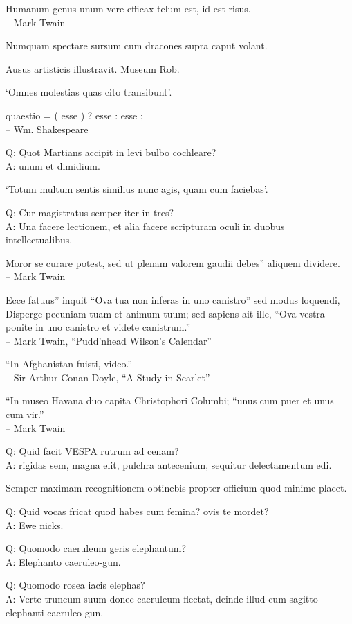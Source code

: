 \documentclass[titlepage,12pt]{memoir}
\begin{document}
Humanum genus unum vere efficax telum est, id est risus.
\\-- Mark Twain

Numquam spectare sursum cum dracones supra caput volant.

Ausus artisticis illustravit. Museum Rob.

‘Omnes molestias quas cito transibunt’.

 quaestio = ( esse ) ? esse : esse ;
\\-- Wm. Shakespeare

Q: Quot Martians accipit in levi bulbo cochleare?\\
A: unum et dimidium.

‘Totum multum sentis similius nunc agis, quam cum faciebas’.

Q: Cur magistratus semper iter in tres?\\
A: Una facere lectionem, et alia facere scripturam
oculi in duobus intellectualibus.

Moror se curare potest, sed ut plenam valorem gaudii debes”
aliquem dividere.
\\-- Mark Twain

Ecce fatuus” inquit “Ova tua non inferas in uno canistro”
sed modus loquendi, Disperge pecuniam tuam et animum tuum; sed sapiens
ait ille, “Ova vestra ponite in uno canistro et videte canistrum.”
\\-- Mark Twain, “Pudd’nhead Wilson’s Calendar”

 “In Afghanistan fuisti, video.”
\\-- Sir Arthur Conan Doyle, “A Study in Scarlet”

“In museo Havana duo capita Christophori Columbi;
“unus cum puer et unus cum vir.”
\\-- Mark Twain

Q: Quid facit VESPA rutrum ad cenam?\\
A: rigidas sem, magna elit, pulchra antecenium, sequitur
delectamentum edi.

Semper maximam recognitionem obtinebis propter officium quod minime placet.

Q: Quid vocas fricat quod habes cum femina?
ovis te mordet?\\
A: Ewe nicks.

Q: Quomodo caeruleum geris elephantum?\\
A: Elephanto caeruleo-gun.

Q: Quomodo rosea iacis elephas?\\
A: Verte truncum suum donec caeruleum flectat, deinde illud cum sagitto
elephanti caeruleo-gun.
\end{document}
